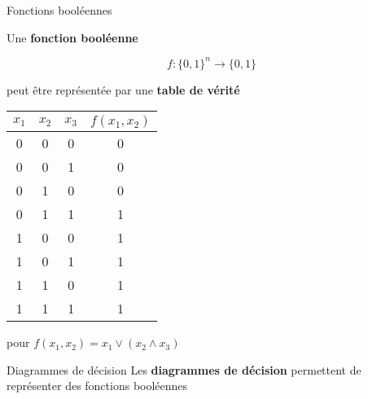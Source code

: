 \begin{frame}{Fonctions booléennes}

    Une \textbf{fonction booléenne}

    $$f : \{0, 1\}^n \to \{0, 1\}$$

    peut être représentée par une \textbf{table de vérité}

    \begin{center}
        \begin{tabular}{c|c|c|c}
            $x_1$ & $x_2$ & $x_3$ & $f(x_1, x_2)$ \\
            \hline
            0 & 0 & 0 & 0 \\
            0 & 0 & 1 & 0 \\
            0 & 1 & 0 & 0 \\
            0 & 1 & 1 & 1 \\
            1 & 0 & 0 & 1 \\
            1 & 0 & 1 & 1 \\
            1 & 1 & 0 & 1 \\
            1 & 1 & 1 & 1
        \end{tabular}

        \vspace{1em}
        \small{pour $f(x_1, x_2) = x_1 \lor (x_2 \land x_3)$}
    \end{center}
\end{frame}

\begin{frame}{Diagrammes de décision}
    Les \textbf{diagrammes de décision} permettent de représenter des fonctions booléennes

\vspace{1em}
\end{frame}

